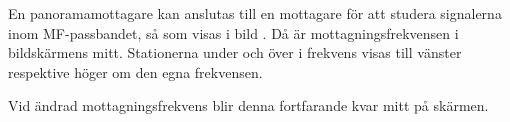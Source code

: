En panoramamottagare kan anslutas till en mottagare för att studera
signalerna inom MF-passbandet, så som visas i bild .
Då är mottagningsfrekvensen i bildskärmens mitt.
Stationerna under och över i frekvens visas till vänster respektive höger
om den egna frekvensen.

Vid ändrad mottagningsfrekvens blir denna fortfarande kvar mitt på skärmen.

